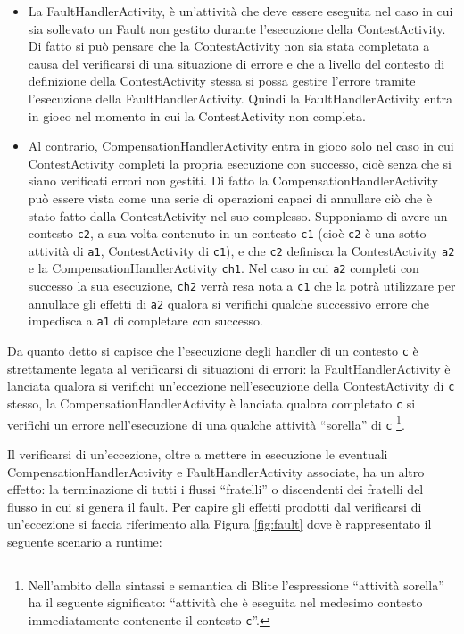 \begin{itemize}
  \item La FaultHandlerActivity, \`e un'attività che deve essere eseguita nel
  caso in cui sia sollevato un Fault non gestito 
  durante l'esecuzione della ContestActivity. Di fatto si può pensare che la
  ContestActivity non sia stata completata a causa del verificarsi di una 
  situazione di errore e che a livello del contesto di definizione della 
  ContestActivity stessa si possa gestire l'errore tramite l'esecuzione della 
  FaultHandlerActivity. Quindi la FaultHandlerActivity entra in gioco nel
  momento in cui la ContestActivity non completa.
  
  \item Al contrario, CompensationHandlerActivity entra in gioco solo nel caso
  in cui ContestActivity completi la propria esecuzione con successo, cioè
  senza che si siano verificati errori non gestiti. Di fatto la
  CompensationHandlerActivity può essere vista come una serie di operazioni
  capaci di annullare ciò che \`e stato fatto dalla ContestActivity nel suo
  complesso. 
  Supponiamo di avere un contesto \texttt{c2}, a sua volta
  contenuto in un contesto \texttt{c1} (cioè \texttt{c2} \`e una sotto
  attività di \texttt{a1}, ContestActivity di \texttt{c1}), e che
  \texttt{c2} definisca la ContestActivity \texttt{a2} e la CompensationHandlerActivity
  \texttt{ch1}. Nel caso in cui \texttt{a2} completi con successo la sua
  esecuzione, \texttt{ch2} verrà resa nota a \texttt{c1} che la potrà
  utilizzare per annullare gli effetti di \texttt{a2} qualora si verifichi
  qualche successivo errore che impedisca a \texttt{a1} di completare con
  successo.
   
\end{itemize}

Da quanto detto si capisce che l'esecuzione degli handler di un contesto
\texttt{c} \`e strettamente legata al verificarsi di situazioni di errori:
la FaultHandlerActivity \`e lanciata qualora si verifichi un'eccezione
nell'esecuzione della ContestActivity di \texttt{c} stesso, la
CompensationHandlerActivity \`e lanciata qualora completato \texttt{c} si
verifichi un errore nell'esecuzione di una qualche attività ``sorella'' di
\texttt{c} \footnote{Nell'ambito della sintassi e semantica di Blite
l'espressione ``attività sorella'' ha il seguente significato: ``attività che \`e eseguita
nel medesimo contesto immediatamente contenente il contesto \texttt{c}''.}.

Il verificarsi di un'eccezione, oltre a mettere in esecuzione le eventuali
CompensationHandlerActivity e FaultHandlerActivity associate, ha un altro
effetto: la terminazione di tutti i flussi ``fratelli'' o discendenti dei
fratelli del flusso in cui si genera il fault. Per capire gli effetti prodotti dal
verificarsi di un'eccezione si faccia riferimento alla Figura \ref{fig:fault}
dove \`e rappresentato il seguente scenario a runtime:

